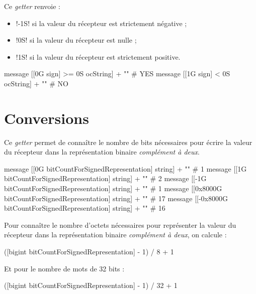 
Ce \emph{getter} renvoie :
\begin{itemize}
\item \ggs!-1S! si la valeur du récepteur est strictement négative ;
\item \ggs!0S! si la valeur du récepteur est nulle ;
\item \ggs!1S! si la valeur du récepteur est strictement positive.
\end{itemize}

\begin{galgas}
message [[0G sign] >= 0S ocString] + "\n" # YES
message [[1G sign] < 0S ocString] + "\n" # NO
\end{galgas}











\section{Conversions}


Ce \emph{getter} permet de connaître le nombre de bits nécessaires pour écrire la valeur du récepteur dans la représentation binaire \emph{complément à deux}.

\begin{galgas}
message [[0G bitCountForSignedRepresentation] string] + "\n" # 1
message [[1G bitCountForSignedRepresentation] string] + "\n" # 2
message [[-1G bitCountForSignedRepresentation] string] + "\n" # 1
message [[0x8000G bitCountForSignedRepresentation] string] + "\n" # 17
message [[-0x8000G bitCountForSignedRepresentation] string] + "\n" # 16
\end{galgas}


Pour connaître le nombre d'octets nécessaires pour représenter la valeur du récepteur dans la représentation binaire \emph{complément à deux}, on calcule :
\begin{galgas}
([bigint bitCountForSignedRepresentation] - 1) / 8 + 1 
\end{galgas}

Et pour le nombre de mots de 32 bits :
\begin{galgas}
([bigint bitCountForSignedRepresentation] - 1) / 32 + 1 
\end{galgas}



